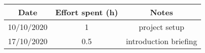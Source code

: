 \documentclass[../../main.tex]{subfiles}
\begin{document}
    \begin{center}
        \begin{tabular}{|c| |c| |c|} 
            \hline
            Date & Effort spent (h) & Notes\\ [0.5ex] 
            \hline\hline
            10/10/2020 & 1 & project setup\\ 
            17/10/2020 & 0.5 & introduction briefing\\ 
            \hline
        \end{tabular}
    \end{center}
\end{document}
